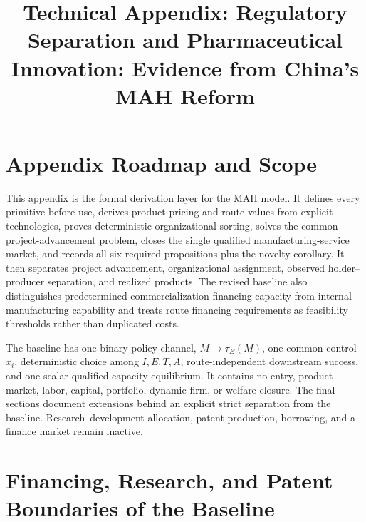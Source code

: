\documentclass[11pt]{article}
\title{Technical Appendix: Regulatory Separation and Pharmaceutical Innovation: Evidence from China's MAH Reform}
\author{}
\date{}
\newcommand{\1}{\mathbf{1}}
\begin{document}
\maketitle
\thispagestyle{plain}

\newpage
\tableofcontents
\newpage
\small

\section{Appendix Roadmap and Scope}
\label{sec:appendix-roadmap}

This appendix is the formal derivation layer for the MAH model. It
defines every primitive before use, derives product pricing and route values
from explicit technologies, proves deterministic organizational sorting,
solves the common project-advancement problem, closes the single qualified
manufacturing-service market, and records all six required propositions plus
the novelty corollary. It then separates project advancement, organizational
assignment, observed holder--producer separation, and realized products.
The revised baseline also distinguishes predetermined commercialization
financing capacity from internal manufacturing capability and treats route
financing requirements as feasibility thresholds rather than duplicated
costs.

The baseline has one binary policy channel, \(M\to\tau_E(M)\), one common
control \(x_i\), deterministic choice among \(I,E,T,A\), route-independent
downstream success, and one scalar qualified-capacity equilibrium. It contains
no entry, product-market, labor, capital, portfolio, dynamic-firm, or welfare
closure. The final sections document extensions behind an explicit strict
separation from the baseline. Research--development allocation, patent
production, borrowing, and a finance market remain inactive.












\section{Financing, Research, and Patent Boundaries of the Baseline}
\label{sec:appendix-research-development-boundary}
\end{document}
